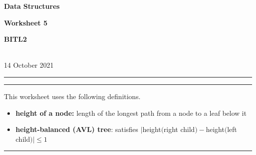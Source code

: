\documentclass[a4paper,12pt]{article}
\begin{document}
\begin{center}
\parbox{3.5cm}{\textbf{Data Structures}} \hfill {\bf\Huge Worksheet 5} \hfill \parbox{3.5cm}{\flushright\textbf{BITL2}} \\[5pt]
\rm\small 14 October 2021
\end{center}

\hrule\vspace{2pt}\hrule


\vspace{10pt}
\noindent
This worksheet uses the following definitions.
\begin{itemize}
\item \textbf{height of a node:} length of the longest path from a node to a leaf below it
\item \textbf{height-balanced (AVL) tree}: satisfies $|$height$($right child$)-$height$($left child$)| \leqslant 1$
\end{itemize}
\hrule
\end{document}

